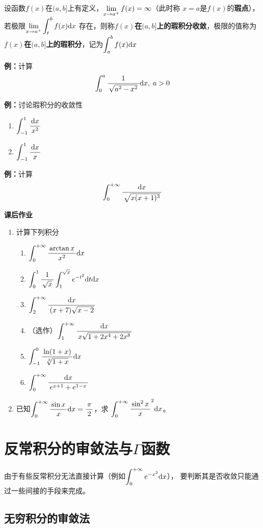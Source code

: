 \begin{thx}
	设函数$f(x)$在$(a,b]$上有定义，$\limx{a^+}f(x)=\infty$（此时称
	$x=a$是$f(x)$的{\bf 瑕点}），若极限$\limx{a^+}\dint_t^bf(x)\d x$
	存在，则称{\bf $f(x)$在$(a,b]$上的瑕积分收敛}，极限的值称为
	{\bf $f(x)$在$(a,b]$上的瑕积分}，记为$\dint_a^bf(x)\d x$
\end{thx}

{\bf 例：}计算
$$\dint_0^a\df{1}{\sqrt{a^2-x^2}}\d x,\;a>0$$

{\bf 例：}讨论瑕积分的收敛性
\begin{enumerate}[(1)]
  \setlength{\itemindent}{1cm}
  \item $\dint_{-1}^1\df{\d x}{x^2}$ 
  \item $\dint_{-1}^1\df{\d x}{x}$
\end{enumerate}

{\bf 例：}计算
$$\dint_0^{+\infty}\df{\d x}{\sqrt{x(x+1)^3}}$$

\begin{ext}
	{\bf 课后作业}	
	\begin{enumerate}
	  \item 计算下列积分
	  \begin{enumerate}[(1)]
	    \item $\dint_0^{+\infty}\df{\arctan x}{x^2}\d x$
	    \item $\dint_0^1\df1{\sqrt x}\dint_1^{\sqrt x}e^{-t^2}\d t\d x$
	    \item $\dint_2^{+\infty}\df{\d x}{(x+7)\sqrt{x-2}}$
	    \item （选作）$\dint_1^{+\infty}\df{\d x}{x\sqrt{1+2x^4+2x^8}}$
	    \item $\dint_{-1}^0\df{\ln(1+x)}{\sqrt[3]{1+x}}\d x$
	    \item $\dint_0^{+\infty}\df{\d x}{e^{x+1}+e^{1-x}}$
	  \end{enumerate}
	  \item 已知$\dint_0^{+\infty}\df{\sin x}x\d x=\df{\pi}2$，求
	  $\dint_0^{+\infty}\df{\sin^2x}x^2\d x$。
	\end{enumerate}
\end{ext}

\section{反常积分的审敛法与$\Gamma$函数}

由于有些反常积分无法直接计算（例如$\dint_0^{+\infty}e^{-x^2}\d x$），
要判断其是否收敛只能通过一些间接的手段来完成。

\subsection{无穷积分的审敛法}

